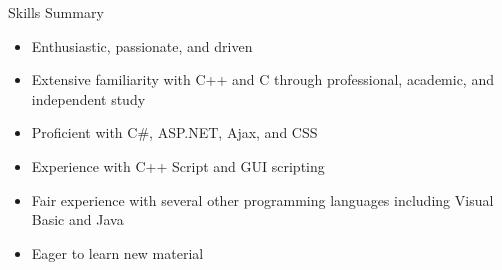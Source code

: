\documentclass[11pt]{article}
\begin{document}
	\begin{section}{Skills Summary}
	
		\begin{itemize}
			\item Enthusiastic, passionate, and driven
			\item Extensive familiarity with C++ and C through professional, academic, and independent study
			\item Proficient with C\#, ASP.NET, Ajax, and CSS
			\item Experience with C++ Script and GUI scripting
			\item Fair experience with several other programming languages including Visual Basic and Java
			\item Eager to learn new material
		\end{itemize}
		
	\end{section}
		
\end{document}
